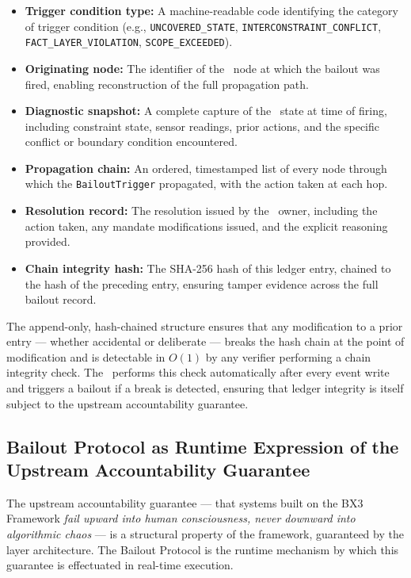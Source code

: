 \begin{itemize}
\item \textbf{Trigger condition type:} A machine-readable code identifying the category of trigger condition (e.g., \texttt{UNCOVERED\_STATE}, \texttt{INTERCONSTRAINT\_CONFLICT}, \texttt{FACT\_LAYER\_VIOLATION}, \texttt{SCOPE\_EXCEEDED}).
\item \textbf{Originating node:} The identifier of the \bounds\ node at which the bailout was fired, enabling reconstruction of the full propagation path.
\item \textbf{Diagnostic snapshot:} A complete capture of the \bounds\ state at time of firing, including constraint state, sensor readings, prior actions, and the specific conflict or boundary condition encountered.
\item \textbf{Propagation chain:} An ordered, timestamped list of every node through which the \texttt{BailoutTrigger} propagated, with the action taken at each hop.
\item \textbf{Resolution record:} The resolution issued by the \purpose\ owner, including the action taken, any mandate modifications issued, and the explicit reasoning provided.
\item \textbf{Chain integrity hash:} The SHA-256 hash of this ledger entry, chained to the hash of the preceding entry, ensuring tamper evidence across the full bailout record.
\end{itemize}

The append-only, hash-chained structure ensures that any modification to a prior entry --- whether accidental or deliberate --- breaks the hash chain at the point of modification and is detectable in $O(1)$ by any verifier performing a chain integrity check. The \fact\ performs this check automatically after every event write and triggers a bailout if a break is detected, ensuring that ledger integrity is itself subject to the upstream accountability guarantee.

\subsection{Bailout Protocol as Runtime Expression of the Upstream Accountability Guarantee}
\label{sec:runtime-expression}

The upstream accountability guarantee --- that systems built on the BX3 Framework \textit{fail upward into human consciousness, never downward into algorithmic chaos} --- is a structural property of the framework, guaranteed by the layer architecture. The Bailout Protocol is the runtime mechanism by which this guarantee is effectuated in real-time execution.

